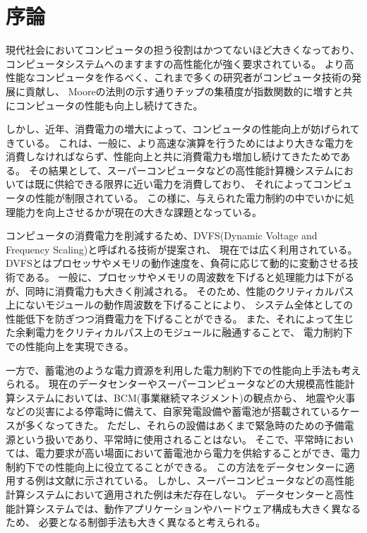 \chapter{序論}

現代社会においてコンピュータの担う役割はかつてないほど大きくなっており、
コンピュータシステムへのますますの高性能化が強く要求されている。
より高性能なコンピュータを作るべく、これまで多くの研究者がコンピュータ技術の発展に貢献し、
Mooreの法則\cite{mooreslaw}の示す通りチップの集積度が指数関数的に増すと共にコンピュータの性能も向上し続けてきた。



しかし、近年、消費電力の増大によって、コンピュータの性能向上が妨げられてきている。
これは、一般に、より高速な演算を行うためにはより大きな電力を消費しなければならず、性能向上と共に消費電力も増加し続けてきたためである。
その結果として、スーパーコンピュータなどの高性能計算機システムにおいては既に供給できる限界に近い電力を消費しており、
それによってコンピュータの性能が制限されている。
この様に、与えられた電力制約の中でいかに処理能力を向上させるかが現在の大きな課題となっている。


コンピュータの消費電力を削減するため、DVFS(Dynamic Voltage and Frequency Scaling)と呼ばれる技術が提案され、
現在では広く利用されている。DVFSとはプロセッサやメモリの動作速度を、負荷に応じて動的に変動させる技術である。
一般に、プロセッサやメモリの周波数を下げると処理能力は下がるが、同時に消費電力も大きく削減される。
そのため、性能のクリティカルパス上にないモジュールの動作周波数を下げることにより、
システム全体としての性能低下を防ぎつつ消費電力を下げることができる。
また、それによって生じた余剰電力をクリティカルパス上のモジュールに融通することで、
電力制約下での性能向上を実現できる。



一方で、蓄電池のような電力資源を利用した電力制約下での性能向上手法も考えられる。
現在のデータセンターやスーパーコンピュータなどの大規模高性能計算システムにおいては、BCM(事業継続マネジメント)の観点から、
地震や火事などの災害による停電時に備えて、自家発電設備や蓄電池が搭載されているケースが多くなってきた。
ただし、それらの設備はあくまで緊急時のための予備電源という扱いであり、平常時に使用されることはない。
そこで、平常時においては、電力要求が高い場面において蓄電池から電力を供給することができ、電力制約下での性能向上に役立てることができる。
この方法をデータセンターに適用する例は文献\cite{Govindan:2011:BLT:2024723.2000105}に示されている。
しかし、スーパーコンピュータなどの高性能計算システムにおいて適用された例は未だ存在しない。
データセンターと高性能計算システムでは、動作アプリケーションやハードウェア構成も大きく異なるため、
必要となる制御手法も大きく異なると考えられる。



